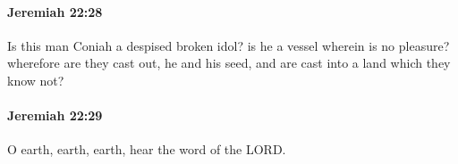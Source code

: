 		\paragraph{Jeremiah 22:28} %
			\label{JEREMIAH-22-28}

			Is this man Coniah a despised broken idol? is he a vessel wherein is no pleasure? wherefore are they cast out, he and his seed, and are cast into a land which they know not?


		\paragraph{Jeremiah 22:29} %
			\label{JEREMIAH-22-29}

			O earth, earth, earth, hear the word of the LORD.


